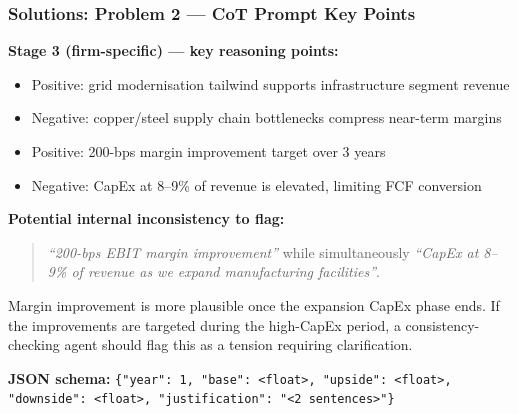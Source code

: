 \documentclass[9pt,t]{beamer}
\begin{document}
\begin{frame}
\frametitle{Solutions: Problem 2 --- CoT Prompt Key Points}

\textbf{Stage 3 (firm-specific) --- key reasoning points:}
\begin{itemize}
  \item Positive: grid modernisation tailwind supports infrastructure segment revenue
  \item Negative: copper/steel supply chain bottlenecks compress near-term margins
  \item Positive: 200-bps margin improvement target over 3 years
  \item Negative: CapEx at 8--9\% of revenue is elevated, limiting FCF conversion
\end{itemize}

\medskip
\textbf{Potential internal inconsistency to flag:}
\begin{quote}
\textit{``200-bps EBIT margin improvement''} while simultaneously \textit{``CapEx at 8--9\% of revenue
as we expand manufacturing facilities''}.
\end{quote}
Margin improvement is more plausible once the expansion CapEx phase ends.
If the improvements are targeted during the high-CapEx period, a consistency-checking
agent should flag this as a tension requiring clarification.

\medskip
\textbf{JSON schema:} \texttt{\{"year": 1, "base": <float>, "upside": <float>,
"downside": <float>, "justification": "<2 sentences>"\}}
\end{frame}
\end{document}
